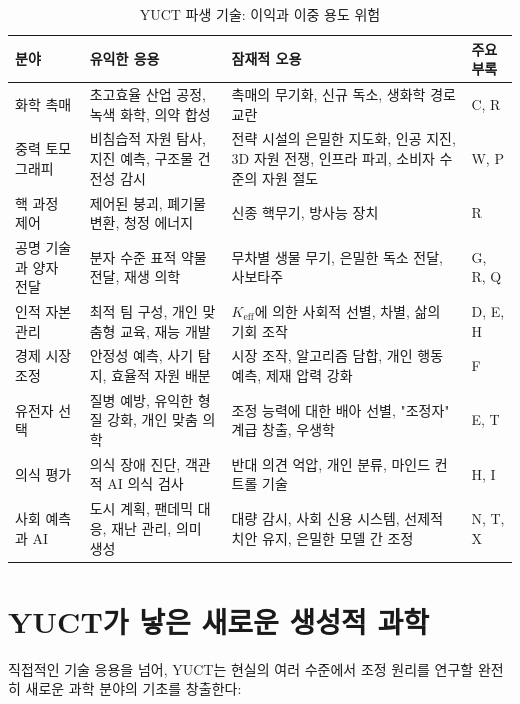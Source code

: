 \documentclass[12pt,a4paper]{article}
\theoremstyle{remark}
\newcommand{\Keff}{K_{\mathrm{eff}}}
\begin{document}
	\begin{table}[htbp]
		\centering
		\caption{YUCT 파생 기술: 이익과 이중 용도 위험}
		\label{tab:tech-summary}
		\small
		\begin{tabularx}{\textwidth}{p{2.8cm}Xp{3.5cm}p{2.5cm}}
			\toprule
			\textbf{분야} & \textbf{유익한 응용} & \textbf{잠재적 오용} & \textbf{주요 부록} \\
			\midrule
			화학 촉매 & 초고효율 산업 공정, 녹색 화학, 의약 합성 & 촉매의 무기화, 신규 독소, 생화학 경로 교란 & C, R \\
			중력 토모그래피 & 비침습적 자원 탐사, 지진 예측, 구조물 건전성 감시 & 전략 시설의 은밀한 지도화, 인공 지진, 3D 자원 전쟁, 인프라 파괴, 소비자 수준의 자원 절도 & W, P \\
			핵 과정 제어 & 제어된 붕괴, 폐기물 변환, 청정 에너지 & 신종 핵무기, 방사능 장치 & R \\
			공명 기술과 양자 전달 & 분자 수준 표적 약물 전달, 재생 의학 & 무차별 생물 무기, 은밀한 독소 전달, 사보타주 & G, R, Q \\
			인적 자본 관리 & 최적 팀 구성, 개인 맞춤형 교육, 재능 개발 & \(\Keff\)에 의한 사회적 선별, 차별, 삶의 기회 조작 & D, E, H \\
			경제 시장 조정 & 안정성 예측, 사기 탐지, 효율적 자원 배분 & 시장 조작, 알고리즘 담합, 개인 행동 예측, 제재 압력 강화 & F \\
			유전자 선택 & 질병 예방, 유익한 형질 강화, 개인 맞춤 의학 & 조정 능력에 대한 배아 선별, "조정자" 계급 창출, 우생학 & E, T \\
			의식 평가 & 의식 장애 진단, 객관적 AI 의식 검사 & 반대 의견 억압, 개인 분류, 마인드 컨트롤 기술 & H, I \\
			사회 예측과 AI & 도시 계획, 팬데믹 대응, 재난 관리, 의미 생성 & 대량 감시, 사회 신용 시스템, 선제적 치안 유지, 은밀한 모델 간 조정 & N, T, X \\
			\bottomrule
		\end{tabularx}
	\end{table}
	
	\section{YUCT가 낳은 새로운 생성적 과학}
	\label{sec:generative}
	
	직접적인 기술 응용을 넘어, YUCT는 현실의 여러 수준에서 조정 원리를 연구할 완전히 새로운 과학 분야의 기초를 창출한다:
	
\end{document}
